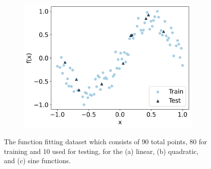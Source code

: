 \documentclass[journal=jacsat,manuscript=article]{achemso}
\begin{document}
\begin{figure}[H]
\begin{subfigure}[b]{0.3\textwidth}
		\centering
		\includegraphics[width=\textwidth]{../images/Function_Fitting/function_dataset/sine_train_vs_test.png}
		\caption{}
		\label{fig:sine_train_vs_test}
	\end{subfigure}
	\caption{The function fitting dataset which consists of 90 total points, 80 for training and 10 used for testing, for the (a) linear, (b) quadratic, and (c) sine functions.}
	\label{fig:train_vs_test}
\end{figure}
\end{document}
